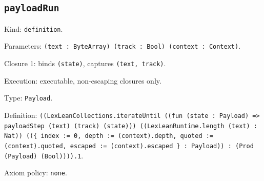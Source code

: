 \documentclass[11pt]{article}
\begin{document}
\subsection*{\texttt{payloadRun}}
\noindent Kind: \texttt{definition}.\par
\noindent Parameters: \texttt{(text : ByteArray) (track : Bool) (context : Context)}.\par
\noindent Closure 1: binds \texttt{(state)}, captures \texttt{(text, track)}.\par
\noindent Execution: executable, non-escaping closures only.\par
\noindent Type: \texttt{Payload}.\par
\noindent Definition: \texttt{((LexLeanCollections.iterateUntil ((fun (state : Payload) => payloadStep (text) (track) (state))) ((LexLeanRuntime.length (text) : Nat)) ((\{ index := 0, depth := (context).depth, quoted := (context).quoted, escaped := (context).escaped \} : Payload)) : (Prod (Payload) (Bool)))).1}.\par
\noindent Axiom policy: \texttt{none}.\par
\end{document}
